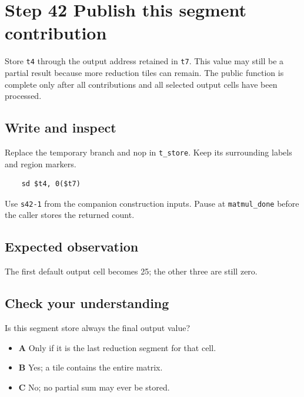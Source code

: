 \section{Step 42 Publish this segment contribution}\label{matmul-s42}

Store \texttt{t4} through the output address retained in \texttt{t7}. This value may still be a partial result because more reduction tiles can remain. The public function is complete only after all contributions and all selected output cells have been processed.

\subsection{Write and inspect}
Replace the temporary branch and nop in \texttt{t\_store}. Keep its surrounding labels and region markers.

\begin{verbatim}
    sd $t4, 0($t7)
\end{verbatim}
Use \texttt{s42-1} from the companion construction inputs. Pause at \texttt{matmul\_done} before the caller stores the returned count.

\subsection{Expected observation}
The first default output cell becomes 25; the other three are still zero.

\subsection{Check your understanding}
Is this segment store always the final output value?

\begin{itemize}
  \item \textbf{A} Only if it is the last reduction segment for that cell.
  \item \textbf{B} Yes; a tile contains the entire matrix.
  \item \textbf{C} No; no partial sum may ever be stored.
\end{itemize}
